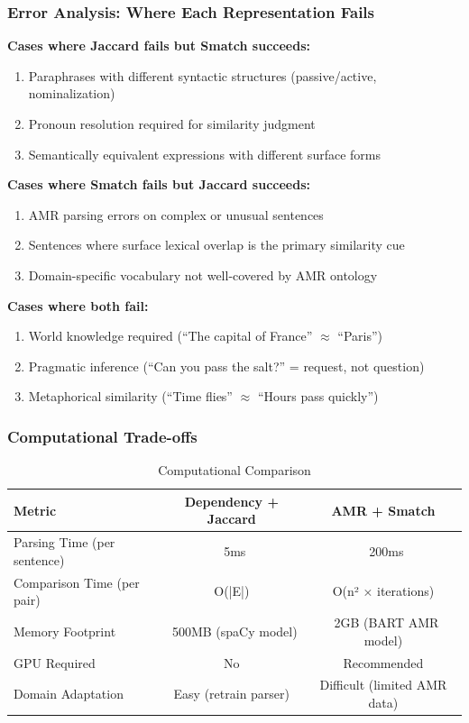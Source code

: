 \documentclass[11pt,a4paper]{article}
\begin{document}
\subsubsection{Error Analysis: Where Each Representation Fails}

\textbf{Cases where Jaccard fails but Smatch succeeds:}
\begin{enumerate}
    \item Paraphrases with different syntactic structures (passive/active, nominalization)
    \item Pronoun resolution required for similarity judgment
    \item Semantically equivalent expressions with different surface forms
\end{enumerate}

\textbf{Cases where Smatch fails but Jaccard succeeds:}
\begin{enumerate}
    \item AMR parsing errors on complex or unusual sentences
    \item Sentences where surface lexical overlap is the primary similarity cue
    \item Domain-specific vocabulary not well-covered by AMR ontology
\end{enumerate}

\textbf{Cases where both fail:}
\begin{enumerate}
    \item World knowledge required (``The capital of France'' $\approx$ ``Paris'')
    \item Pragmatic inference (``Can you pass the salt?'' = request, not question)
    \item Metaphorical similarity (``Time flies'' $\approx$ ``Hours pass quickly'')
\end{enumerate}

\subsubsection{Computational Trade-offs}

\begin{table}[h]
\centering
\caption{Computational Comparison}
\begin{tabular}{lcc}
\toprule
\textbf{Metric} & \textbf{Dependency + Jaccard} & \textbf{AMR + Smatch} \\
\midrule
Parsing Time (per sentence) & ~5ms & ~200ms \\
Comparison Time (per pair) & O(|E|) & O(n² × iterations) \\
Memory Footprint & ~500MB (spaCy model) & ~2GB (BART AMR model) \\
GPU Required & No & Recommended \\
Domain Adaptation & Easy (retrain parser) & Difficult (limited AMR data) \\
\bottomrule
\end{tabular}
\end{table}
\end{document}
